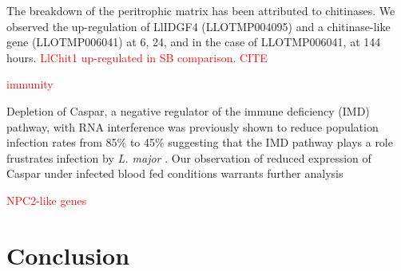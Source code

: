 The breakdown of the peritrophic matrix has been attributed to chitinases. We observed the up-regulation of LlIDGF4 (LLOTMP004095) and a chitinase-like gene (LLOTMP006041) at 6, 24, and in the case of LLOTMP006041, at 144 hours.   \textcolor{red}{LlChit1 up-regulated in SB comparison. CITE}

\textcolor{red}{immunity}


Depletion of Caspar, a negative regulator of the immune deficiency (IMD) pathway, with RNA interference was previously shown to reduce population infection rates from 85\% to 45\% suggesting that the IMD pathway plays a role frustrates infection by \emph{L. major} \cite{Telleria2012}.  Our observation of reduced expression of Caspar under infected blood fed conditions warrants further analysis

\textcolor{red}{NPC2-like genes}

\section{Conclusion}





